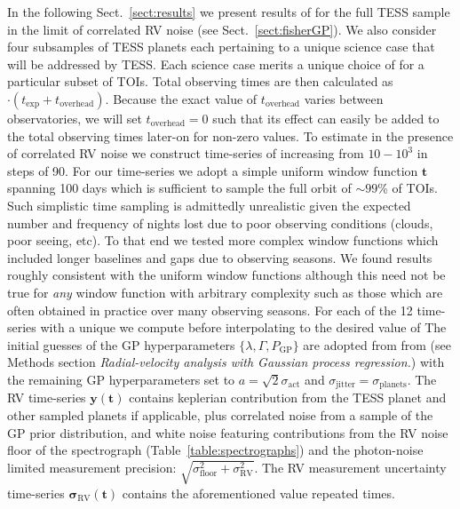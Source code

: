 In the following Sect.~\ref{sect:results} we present results of \nrv{} for the full TESS sample in the
limit of correlated RV noise (see Sect.~\ref{sect:fisherGP}). We also consider four subsamples of TESS
planets each pertaining to a unique science case that will be
addressed by TESS. Each science case merits a unique choice of \sigK{} for a
particular subset of TOIs. Total observing times are then calculated as 
\nrv{}$\cdot (t_{\text{exp}}+t_{\text{overhead}})$. Because the exact value of $t_{\text{overhead}}$ varies
between observatories, we will set $t_{\text{overhead}}=0$ such that its effect can easily
be added to the total observing times later-on for non-zero values. To estimate \nrv{} in the presence
of correlated RV noise we construct time-series of increasing \nrv{} from $10-10^3$ in steps of 90.
For our time-series we adopt a simple uniform window function $\mathbf{t}$ spanning 100 days
which is sufficient to sample the full orbit of $\sim 99$\% of TOIs. Such simplistic
time sampling is admittedly unrealistic given the expected number and frequency of nights
lost due to poor observing conditions (clouds, poor seeing, etc). To that end we
tested more complex window functions 
which included longer baselines and gaps due to observing seasons.
We found results roughly consistent with the uniform window
functions although this need not be true for \emph{any} window function with arbitrary complexity
such as those which are often obtained in practice over many observing seasons.
For each of the 12 time-series with a unique \nrv{} we compute \sigK{} before
interpolating \nrv{(}\sigK{)} to the desired value of  The
initial guesses of the GP hyperparameters $\{\lambda, \Gamma, P_{\text{GP}} \}$ are adopted from
from \cite{dittmann17} (see Methods section \emph{Radial-velocity analysis with Gaussian process regression.})
with the remaining GP hyperparameters set to $a=\sqrt{2}\sigma_{\text{act}}$ and
$\sigma_{\text{jitter}}=\sigma_{\text{planets}}$. The RV time-series $\mathbf{y}(\mathbf{t})$
contains keplerian contribution from the
TESS planet and other sampled planets if applicable, plus correlated noise from a sample of the GP prior
distribution, and white noise featuring contributions from the RV noise floor of the spectrograph  
(Table~\ref{table:spectrographs}) and the photon-noise limited measurement precision:
$\sqrt{\sigma_{\text{floor}}^2 + \sigma_{\text{RV}}^2}$. 
The RV measurement uncertainty time-series $\boldsymbol{\sigma}_{\text{RV}}(\mathbf{t})$
contains the aforementioned value repeated \nrv{} times.


